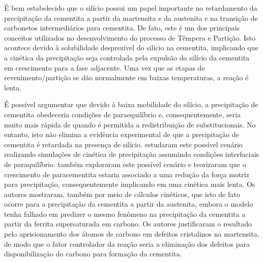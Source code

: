 É bem estabelecido que o silício possui um papel importante no retardamento da precipitação da cementita a partir da martensita e da austenita e na transição de carbonetos intermediários para cementita. De fato, este é um dos principais conceitos utilizados no desenvolvimento do processo de Têmpera e Partição. Isto acontece devido à solubilidade desprezível do silício na cementita\cite{Owen1951,Barnard1981a}, implicando que a cinética da precipitação seja controlada pela expulsão do silício da cementita em crescimento para a fase adjacente. Uma vez que as etapas de revenimento/partição se dão normalmente em baixas temperaturas, a reação é lenta.

É possível argumentar que devido à baixa mobilidade do silício, a precipitação de cementita obedeceria condições de paraequilíbrio e, consequentemente, seria muito mais rápida de quando é permitida a redistribuição de substitucionais. No entanto, isto não elimina a evidência experimental de que a precipitação de cementita é retardada na presença de silício.  estudaram este possível cenário realizando simulações de cinética de precipitação assumindo condições interfaciais de paraquilíbrio.  também exploraram este possível cenário e teorizaram que o crescimento de paracementita estaria associado a uma redução da força motriz para precipitação, consequentemente implicando em uma cinética mais lenta. Os autores mostraram, também por meio de cálculos cinéticos, que isto de fato ocorre para a precipitação da cementita a partir da austenita, embora o modelo tenha falhado em predizer o mesmo fenômeno na precipitação da cementita a partir da ferrita supersaturada em carbono. Os autores justificaram o resultado pelo aprisionamento dos átomos de carbono em defeitos cristalinos na martensita, de modo que o fator controlador da reação seria a eliminação dos defeitos para disponibilização do carbono para formação da cementita.


